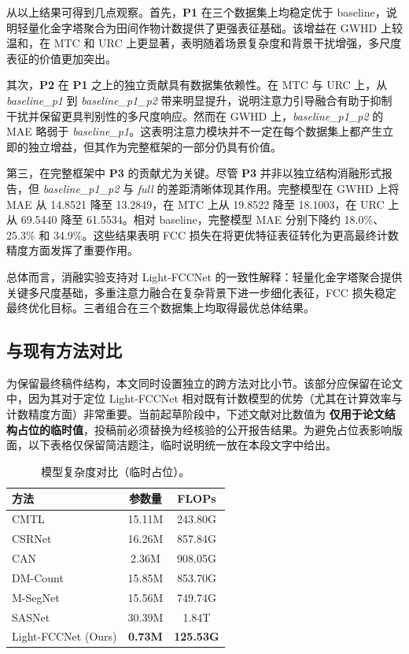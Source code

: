 \documentclass[a4paper,fleqn]{cas-sc}
\newcommand{\tablesize}{\small}
\begin{document}
从以上结果可得到几点观察。首先，\textbf{P1} 在三个数据集上均稳定优于 baseline，说明轻量化金字塔聚合为田间作物计数提供了更强表征基础。该增益在 GWHD 上较温和，在 MTC 和 URC 上更显著，表明随着场景复杂度和背景干扰增强，多尺度表征的价值更加突出。

其次，\textbf{P2} 在 \textbf{P1} 之上的独立贡献具有数据集依赖性。在 MTC 与 URC 上，从 \textit{baseline\_p1} 到 \textit{baseline\_p1\_p2} 带来明显提升，说明注意力引导融合有助于抑制干扰并保留更具判别性的多尺度响应。然而在 GWHD 上，\textit{baseline\_p1\_p2} 的 MAE 略弱于 \textit{baseline\_p1}。这表明注意力模块并不一定在每个数据集上都产生立即的独立增益，但其作为完整框架的一部分仍具有价值。

第三，在完整框架中 \textbf{P3} 的贡献尤为关键。尽管 \textbf{P3} 并非以独立结构消融形式报告，但 \textit{baseline\_p1\_p2} 与 \textit{full} 的差距清晰体现其作用。完整模型在 GWHD 上将 MAE 从 14.8521 降至 13.2849，在 MTC 上从 19.8522 降至 18.1003，在 URC 上从 69.5440 降至 61.5534。相对 baseline，完整模型 MAE 分别下降约 18.0\%、25.3\% 和 34.9\%。这些结果表明 FCC 损失在将更优特征表征转化为更高最终计数精度方面发挥了重要作用。

总体而言，消融实验支持对 Light-FCCNet 的一致性解释：轻量化金字塔聚合提供关键多尺度基础，多重注意力融合在复杂背景下进一步细化表征，FCC 损失稳定最终优化目标。三者组合在三个数据集上均取得最优总体结果。

\subsection{与现有方法对比}

为保留最终稿件结构，本文同时设置独立的跨方法对比小节。该部分应保留在论文中，因为其对于定位 Light-FCCNet 相对既有计数模型的优势（尤其在计算效率与计数精度方面）非常重要。当前起草阶段中，下述文献对比数值为 \textbf{仅用于论文结构占位的临时值}，投稿前必须替换为经核验的公开报告结果。为避免占位表影响版面，以下表格仅保留简洁题注，临时说明统一放在本段文字中给出。

\begin{table}[!htbp]
    \centering
    \caption{模型复杂度对比（临时占位）。}
    \label{tab:complexity_placeholder}
    \tablesize
    \setlength{\tabcolsep}{8pt}
    \begin{tabular}{@{}lcc@{}}
        \toprule
        方法 & 参数量 & FLOPs \\
        \midrule
        CMTL                & 15.11M & 243.80G \\
        CSRNet              & 16.26M & 857.84G \\
        CAN                 & 2.36M  & 908.05G \\
        DM-Count            & 15.85M & 853.70G \\
        M-SegNet            & 15.56M & 749.74G \\
        SASNet              & 30.39M & 1.84T \\
        Light-FCCNet (Ours) & \textbf{0.73M} & \textbf{125.53G} \\
        \bottomrule
    \end{tabular}
\end{table}
\end{document}
